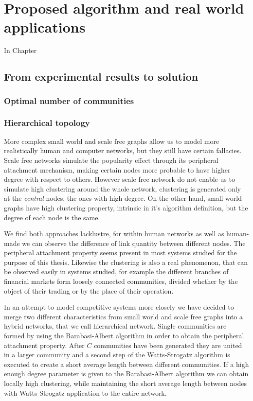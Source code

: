 \chapter{Proposed algorithm and real world applications}
\label{chapter:algorithm}

In Chapter 

\section{From experimental results to solution}
\label{sec:proposed algorithm}

\subsection{Optimal number of communities}
\label{subsec:optimal beta}

\subsection{Hierarchical topology}
\label{subsec:hierarchical}

More complex small world and scale free graphs allow us to model more realistically human and computer networks, but they still have certain fallacies.
Scale free networks simulate the popularity effect through its peripheral attachment mechanism, making certain nodes more probable to have higher degree with respect to others.
However scale free network do not enable us to simulate high clustering around the whole network, clustering is generated only at the \textit{central} nodes, the ones with high degree.
On the other hand, small world graphs have high clustering property, intrinsic in it's algorithm definition, but the degree of each node is the same.

We find both approaches lacklustre, for within human networks as well as human-made we can observe the difference of link quantity between different nodes.
The peripheral attachment property seems present in most systems studied for the purpose of this thesis.
Likewise the clustering is also a real phenomenon, that can be observed easily in systems studied, for example the different branches of financial markets form loosely connected communities, divided whether by the object of their trading or by the place of their operation.

In an attempt to model competitive systems more closely we have decided to merge two different characteristics from small world and scale free graphs into a hybrid networks, that we call hierarchical network.
Single communities are formed by using the Barabasi-Albert algorithm in order to obtain the peripheral attachment property.
After $C$ communities have been generated they are united in a larger community and a second step of the Watts-Strogatz algorithm is executed to create a short average length between different communities.
If a high enough degree parameter is given to the Barabasi-Albert algorithm we can obtain locally high clustering, while maintaining the short average length between nodes with Watts-Strogatz application to the entire network.

